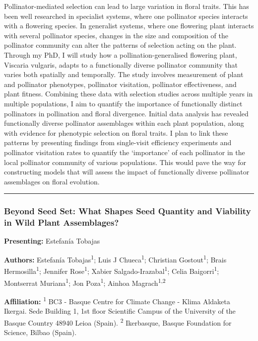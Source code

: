 \documentclass[
  letterpaper,
  DIV=11,
  numbers=noendperiod]{scrartcl}
\begin{document}
Pollinator-mediated selection can lead to large variation in floral
traits. This has been well researched in specialist systems, where one
pollinator species interacts with a flowering species. In generalist
systems, where one flowering plant interacts with several pollinator
species, changes in the size and composition of the pollinator community
can alter the patterns of selection acting on the plant. Through my PhD,
I will study how a pollination-generalised flowering plant, Viscaria
vulgaris, adapts to a functionally diverse pollinator community that
varies both spatially and temporally. The study involves measurement of
plant and pollinator phenotypes, pollinator visitation, pollinator
effectiveness, and plant fitness. Combining these data with selection
studies across multiple years in multiple populations, I aim to quantify
the importance of functionally distinct pollinators in pollination and
floral divergence. Initial data analysis has revealed functionally
diverse pollinator assemblages within each plant population, along with
evidence for phenotypic selection on floral traits. I plan to link these
patterns by presenting findings from single-visit efficiency experiments
and pollinator visitation rates to quantify the `importance' of each
pollinator in the local pollinator community of various populations.
This would pave the way for constructing models that will assess the
impact of functionally diverse pollinator assemblages on floral
evolution.

\begin{center}\rule{0.5\linewidth}{0.5pt}\end{center}

\subsubsection{Beyond Seed Set: What Shapes Seed Quantity and Viability
in Wild Plant
Assemblages?}\label{beyond-seed-set-what-shapes-seed-quantity-and-viability-in-wild-plant-assemblages}

\textbf{Presenting:} Estefanía Tobajas

\textbf{Authors:} Estefanía Tobajas\textsuperscript{1}; Luis J
Chueca\textsuperscript{1}; Christian Gostout\textsuperscript{1}; Brais
Hermosilla\textsuperscript{1}; Jennifer Rose\textsuperscript{1}; Xabier
Salgado-Irazabal\textsuperscript{1}; Celia Baigorri\textsuperscript{1};
Montserrat Muriana\textsuperscript{1}; Jon Poza\textsuperscript{1};
Ainhoa Magrach\textsuperscript{1,2}

\textbf{Affiliation:} \textsuperscript{1} BC3 - Basque Centre for
Climate Change - Klima Aldaketa Ikergai. Sede Building 1, 1st floor
\textbar{} Scientific Campus of the University of the Basque Country
48940 Leioa (Spain). \textsuperscript{2} Ikerbasque, Basque Foundation
for Science, Bilbao (Spain).
\end{document}
